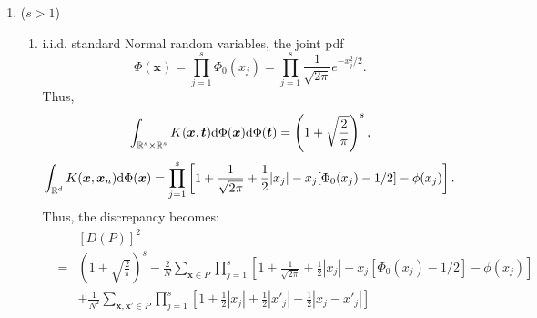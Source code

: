 \documentclass[12pt]{article}
\newcommand{\reals}{\mathbb{R}}
\newcommand{\vx}{\boldsymbol{x}}
\newcommand{\vt}{\boldsymbol{t}}
\newcommand{\dif}{{\rm d}}
\begin{document}
\begin{enumerate}
   \item ($s>1$)
   \begin{enumerate}
       \item 
       i.i.d. standard Normal random variables, the joint pdf 
       $$\Phi(\vx) = \prod\limits_{j=1}^s\Phi_0(x_j) = \prod\limits_{j=1}^s \frac{1}{\sqrt{2\pi}}e^{-x_j^2/2}.$$
       Thus, 
       $$\int_{\reals^s\times \reals^s} K(\vx,\vt)\dif\Phi(\vx)\dif\Phi(\vt) = \left(1+\sqrt{\frac{2}{\pi}}\right)^s,$$
       $$\int_{\reals^d}K(\vx,\vx_n)\dif\Phi(\vx) = \prod\limits_{j=1}^s\left[ 1+\frac{1}{\sqrt{2\pi}}+\frac{1}{2}|x_j|-x_j[\Phi_0(x_j)-1/2]-\phi(x_j)\right].$$
       Thus, the discrepancy becomes:
       \begin{eqnarray*}
 &&[D(P)]^2\\
  &=& \left(1+\sqrt{\frac{2}{\pi}}\right)^s - \frac{2}{N}\sum\limits_{\vx\in P} \prod\limits_{j=1}^s\left[ 1+\frac{1}{\sqrt{2\pi}}+\frac{1}{2}|x_j|-x_j[\Phi_0(x_j)-1/2]-\phi(x_j)\right]\\
  &&+\frac{1}{N^2}\sum_{\vx,\vx'\in P}\prod_{j=1}^s \left[1+\frac{1}{2}|x_j|+\frac{1}{2}|x'_j|-\frac{1}{2}|x_j-x'_j|\right]
\end{eqnarray*}       
   \end{enumerate}
   
   
\end{enumerate}
\end{document}
